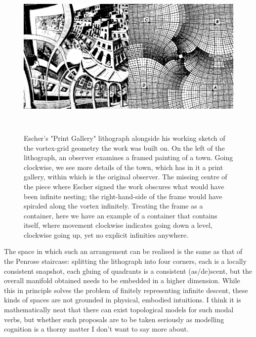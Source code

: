 \begin{figure}[h!]
\centering
\includegraphics[height=8cm]{figures/bubbles/combined}
\caption{Escher's "Print Gallery" lithograph alongside his working sketch of the vortex-grid geometry the work was built on. On the left of the lithograph, an observer examines a framed painting of a town. Going clockwise, we see more details of the town, which has in it a print gallery, within which is the original observer. The missing centre of the piece where Escher signed the work obscures what would have been infinite nesting; the right-hand-side of the frame would have spiraled along the vortex infinitely. Treating the frame as a container, here we have an example of a container that contains itself, where movement clockwise indicates going down a level, clockwise going up, yet no explicit infinities anywhere.}
\label{fig:gallery}
\end{figure}

The space in which such an arrangement can be realised is the same as that of the Penrose staircase: splitting the lithograph into four corners, each is a locally consistent snapshot, each gluing of quadrants is a consistent (as/de)scent, but the overall manifold obtained needs to be embedded in a higher dimension. While this in principle solves the problem of finitely representing infinite descent, these kinds of spaces are not grounded in physical, embodied intuitions. I think it is mathematically neat that there can exist topological models for such modal verbs, but whether such proposals are to be taken seriously as modelling cognition is a thorny matter I don't want to say more about.